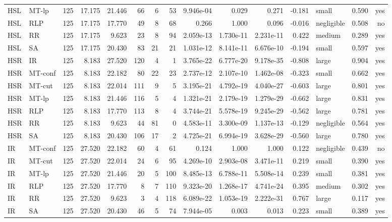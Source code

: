 \begin{table}[htbp]
\begin{tabular}{llrrrrrrrrrrlrr}
HSL & MT-lp & 125 & 17.175 & 21.446 & 66 & 6 & 53 & 9.946e-04 & 0.029 & 0.271 & -0.181 & small & 0.590 & yes \\
HSL & RLP & 125 & 17.175 & 17.770 & 49 & 8 & 68 & 0.266 & 1.000 & 0.096 & -0.016 & negligible & 0.508 & no \\
HSL & RR & 125 & 17.175 & 9.623 & 23 & 8 & 94 & 2.059e-13 & 1.730e-11 & 2.231e-11 & 0.422 & medium & 0.289 & yes \\
HSL & SA & 125 & 17.175 & 20.430 & 83 & 21 & 21 & 1.031e-12 & 8.141e-11 & 6.676e-10 & -0.194 & small & 0.597 & yes \\
HSR & IR & 125 & 8.183 & 27.520 & 120 & 4 & 1 & 3.765e-22 & 6.777e-20 & 9.178e-35 & -0.808 & large & 0.904 & yes \\
HSR & MT-conf & 125 & 8.183 & 22.182 & 80 & 22 & 23 & 2.737e-12 & 2.107e-10 & 1.462e-08 & -0.323 & small & 0.662 & yes \\
HSR & MT-cut & 125 & 8.183 & 22.014 & 111 & 9 & 5 & 3.195e-21 & 4.792e-19 & 4.040e-27 & -0.603 & large & 0.801 & yes \\
HSR & MT-lp & 125 & 8.183 & 21.446 & 116 & 5 & 4 & 1.321e-21 & 2.179e-19 & 1.279e-29 & -0.662 & large & 0.831 & yes \\
HSR & RLP & 125 & 8.183 & 17.770 & 113 & 8 & 4 & 3.744e-21 & 5.578e-19 & 9.245e-29 & -0.562 & large & 0.781 & yes \\
HSR & RR & 125 & 8.183 & 9.623 & 44 & 81 & 0 & 4.583e-11 & 3.300e-09 & 1.137e-13 & -0.129 & negligible & 0.564 & yes \\
HSR & SA & 125 & 8.183 & 20.430 & 106 & 17 & 2 & 4.725e-21 & 6.994e-19 & 3.628e-29 & -0.560 & large & 0.780 & yes \\
IR & MT-conf & 125 & 27.520 & 22.182 & 60 & 4 & 61 & 0.124 & 1.000 & 1.000 & 0.122 & negligible & 0.439 & no \\
IR & MT-cut & 125 & 27.520 & 22.014 & 24 & 6 & 95 & 4.269e-10 & 2.903e-08 & 3.471e-11 & 0.219 & small & 0.390 & yes \\
IR & MT-lp & 125 & 27.520 & 21.446 & 20 & 5 & 100 & 8.485e-13 & 6.788e-11 & 5.508e-14 & 0.239 & small & 0.381 & yes \\
IR & RLP & 125 & 27.520 & 17.770 & 8 & 7 & 110 & 9.323e-20 & 1.268e-17 & 4.741e-24 & 0.395 & medium & 0.302 & yes \\
IR & RR & 125 & 27.520 & 9.623 & 3 & 4 & 118 & 6.089e-22 & 1.053e-19 & 2.222e-31 & 0.767 & large & 0.117 & yes \\
IR & SA & 125 & 27.520 & 20.430 & 46 & 5 & 74 & 7.944e-05 & 0.003 & 0.013 & 0.223 & small & 0.389 & yes \\

\end{tabular}
\end{table}
